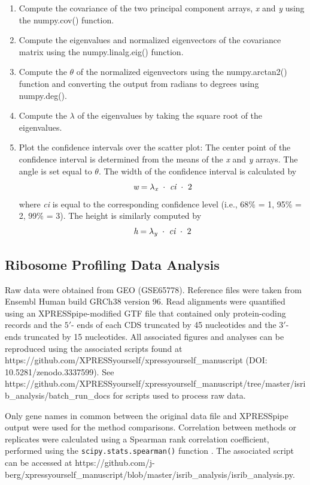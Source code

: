\documentclass[10pt, oneside]{article}
\begin{document}
\begin{enumerate}
  \item Compute the covariance of the two principal component arrays, \textit{x} and \textit{y} using the numpy.cov() function.

  \item Compute the eigenvalues and normalized eigenvectors of the covariance matrix using the numpy.linalg.eig() function.

  \item Compute the $\theta$ of the normalized eigenvectors using the numpy.arctan2() function and converting the output from radians to degrees using numpy.deg().

  \item Compute the $\lambda$ of the eigenvalues by taking the square root of the eigenvalues.

  \item Plot the confidence intervals over the scatter plot: The center point of the confidence interval is determined from the means of the \textit{x} and \textit{y} arrays. The angle is set equal to $\theta$. The width of the confidence interval is calculated by
  \[
  \textit{w} = \lambda _{\textit{\scriptsize{x}}}\ \cdot\ \textit{ci}\ \cdot\ 2
  \]
  where \textit{ci} is equal to the corresponding confidence level (i.e., 68\% = 1, 95\% = 2, 99\% = 3). The height is similarly computed by
  \[
  \textit{h} = \lambda _{\textit{\scriptsize{y}}}\ \cdot\ \textit{ci}\ \cdot\ 2
  \]
\end{enumerate}

\subsection{Ribosome Profiling Data Analysis}
Raw data were obtained from GEO (GSE65778). Reference files were taken from Ensembl Human build GRCh38 version 96. Read alignments were quantified using an XPRESSpipe-modified GTF file that contained only protein-coding records and the $5'$- ends of each CDS truncated by 45 nucleotides and the $3'$- ends truncated by 15 nucleotides. All associated figures and analyses can be reproduced using the associated scripts found at https://github.com/XPRESSyourself/xpressyourself\_manuscript (DOI: 10.5281/zenodo.3337599). See https://github.com/XPRESSyourself/xpressyourself\_manuscript/tree/master/isrib\_analysis/batch\_run\_docs for scripts used to process raw data. \par

Only gene names in common between the original data file and XPRESSpipe output were used for the method comparisons. Correlation between methods or replicates were calculated using a Spearman rank correlation coefficient, performed using the \texttt{scipy.stats.spearman()} function \cite{spearman_rnaseq}. The associated script can be accessed at https://github.com/j-berg/xpressyourself\_manuscript/blob/master/isrib\_analysis/isrib\_analysis.py. \par
\end{document}
